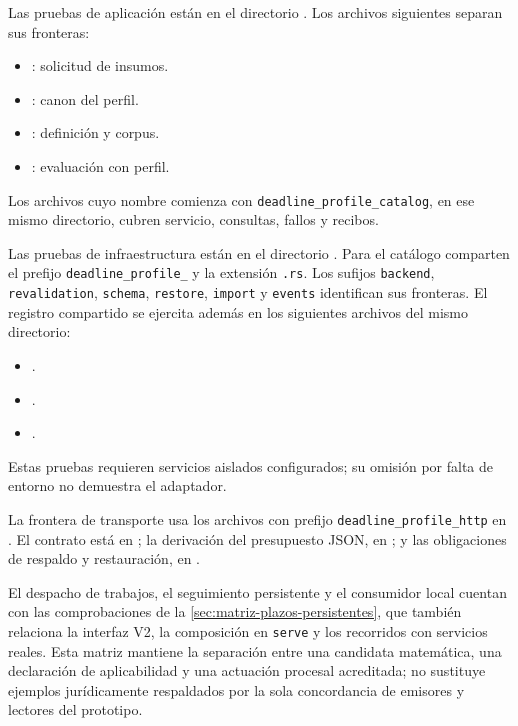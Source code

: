 {\raggedright
Las pruebas de aplicación están en el directorio
. Los archivos siguientes separan sus
fronteras:
\begin{itemize}
  \item {}: solicitud de insumos.
  \item {}: canon del perfil.
  \item {}: definición y corpus.
  \item {}: evaluación con perfil.
\end{itemize}
Los archivos cuyo nombre comienza con \texttt{deadline\_profile\_catalog},
en ese mismo directorio, cubren servicio, consultas, fallos y recibos.
\par}

{\raggedright
Las pruebas de infraestructura están en el directorio
. Para el catálogo comparten el prefijo
\texttt{deadline\_profile\_} y la extensión \texttt{.rs}. Los sufijos
\texttt{backend}, \texttt{revalidation}, \texttt{schema}, \texttt{restore},
\texttt{import} y \texttt{events} identifican sus fronteras.
El registro compartido se ejercita además en los siguientes archivos del mismo
directorio:
\begin{itemize}
  \item {}.
  \item {}.
  \item {}.
\end{itemize}
Estas pruebas requieren servicios aislados configurados; su omisión por falta
de entorno no demuestra el adaptador.
\par}

La frontera de transporte usa los archivos con prefijo \texttt{deadline\_profile\_http} en . El contrato está en ; la derivación del presupuesto JSON, en ; y las obligaciones de respaldo y restauración, en .

El despacho de trabajos, el seguimiento persistente y el consumidor local cuentan con las comprobaciones de la \cref{sec:matriz-plazos-persistentes}, que también relaciona la interfaz V2, la composición en \texttt{serve} y los recorridos con servicios reales. Esta matriz mantiene la separación entre una candidata matemática, una declaración de aplicabilidad y una actuación procesal acreditada; no sustituye ejemplos jurídicamente respaldados por la sola concordancia de emisores y lectores del prototipo.
